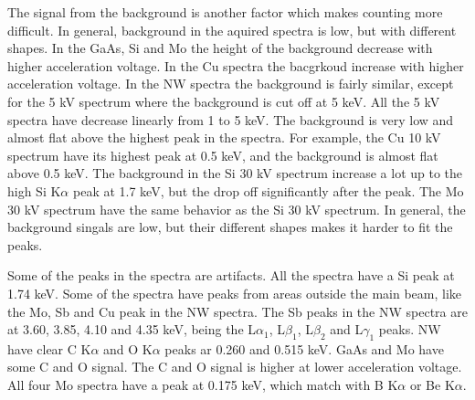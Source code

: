 The signal from the background is another factor which makes counting more difficult.
In general, background in the aquired spectra is low, but with different shapes.
In the GaAs, Si and Mo the height of the background decrease with higher acceleration voltage.
In the Cu spectra the bacgrkoud increase with higher acceleration voltage.
In the NW spectra the background is fairly similar, except for the 5 kV spectrum where the background is cut off at 5 keV.
All the 5 kV spectra have decrease linearly from 1 to 5 keV.
The background is very low and almost flat above the highest peak in the spectra. %
For example, the Cu 10 kV spectrum have its highest peak at 0.5 keV, and the background is almost flat above 0.5 keV.
The background in the Si 30 kV spectrum increase a lot up to the high Si K$\alpha$ peak at 1.7 keV, but the drop off significantly after the peak. %
The Mo 30 kV spectrum have the same behavior as the Si 30 kV spectrum.
In general, the background singals are low, but their different shapes makes it harder to fit the peaks.





Some of the peaks in the spectra are artifacts.
All the spectra have a Si peak at 1.74 keV. %
Some of the spectra have peaks from areas outside the main beam, like the Mo, Sb and Cu peak in the NW spectra. %
The Sb peaks in the NW spectra are at 3.60, 3.85, 4.10 and 4.35 keV, being the L$\alpha_1$, L$\beta_1$, L$\beta_2$ and L$\gamma_1$ peaks.
NW have clear C K$\alpha$ and O K$\alpha$ peaks ar 0.260 and 0.515 keV.
GaAs and Mo have some C and O signal.
The C and O signal is higher at lower acceleration voltage.
All four Mo spectra have a peak at 0.175 keV, which match with B K$\alpha$ or Be K$\alpha$.

